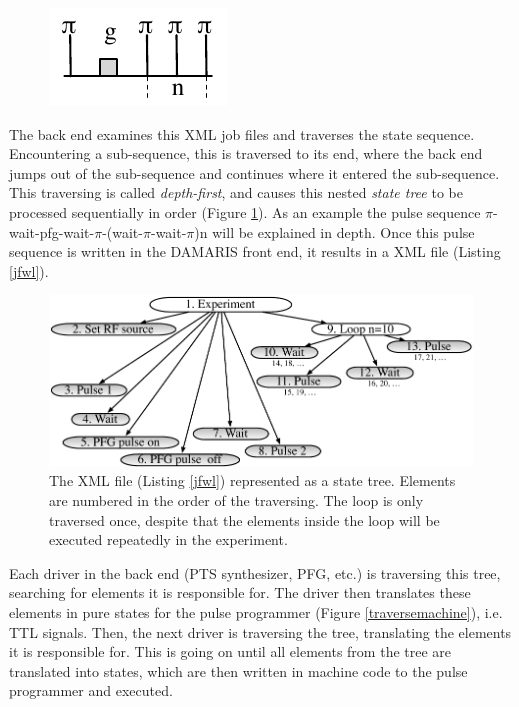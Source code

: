 \documentclass[12pt, a4paper, BCOR10mm, twoside, titlepage, headinclude]{scrbook}
\begin{document}
\begin{figure}
\mbox{\includegraphics[]{devsequence}}
\end{figure}
The back end examines this \textsf{XML} job files and traverses the state sequence. Encountering a sub-sequence, this is traversed to its end, where the back end jumps out of the sub-sequence and continues where it entered the sub-sequence. This traversing is called \emph{depth-first}, and causes this nested \emph{state tree} to be processed sequentially in order (Figure \ref{traverseex}).
As an example the pulse sequence $\pi$-wait-pfg-wait-$\pi$-(wait-$\pi$-wait-$\pi$)n will be explained in depth. Once this pulse sequence is written in the \textsf{DAMARIS} front end, it results in a \textsf{XML} file (Listing \ref{jfwl}).

\begin{figure}
\centering
\includegraphics[]{traversing_example}
\caption{The \textsf{XML} file (Listing \ref{jfwl}) represented as a state tree. Elements are numbered in the order of the traversing. The loop is only traversed once, despite that the elements inside the loop will be executed repeatedly in the experiment. }
\label{traverseex}
\end{figure}
Each driver in the back end (PTS synthesizer, PFG, etc.) is traversing this tree, searching for elements it is responsible for. The driver then translates these elements in pure states for the pulse programmer (Figure \ref{traversemachine}), i.e. TTL  signals. Then, the next driver is traversing the tree, translating the elements it is responsible for. This is going on until all elements from the tree are translated into states, which are then written in machine code to the pulse programmer and executed.
\end{document}
